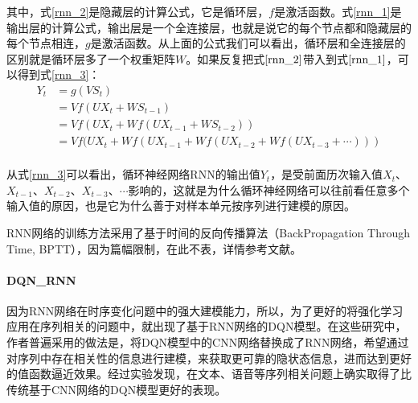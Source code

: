 其中，式\eqref{rnn_2}是隐藏层的计算公式，它是循环层，$f$是激活函数。式\eqref{rnn_1}是输出层的计算公式，输出层是一个全连接层，也就是说它的每个节点都和隐藏层的每个节点相连，$g$是激活函数。从上面的公式我们可以看出，循环层和全连接层的区别就是循环层多了一个权重矩阵$W$。如果反复把式$\eqref{rnn_2}$带入到式$\eqref{rnn_1}$，可以得到式\eqref{rnn_3}：
\begin{equation}
\label{rnn_3}
\begin{aligned}
Y_{t}&=g(V S_{t})\\
&=V f(U X_{t}+W S_{t-1})\\
&=V f(U X_{t}+W f(U X_{t-1}+W S_{t-2}))\\
&=V f(U X_{t}+W f(U X_{t-1}+W f(U X_{t-2}+W f(U X_{t-3}+\cdots)))\\
\end{aligned}
\end{equation}

从式\eqref{rnn_3}可以看出，循环神经网络RNN的输出值$Y_{t}$，是受前面历次输入值$X_{t}$、$X_{t-1}$、$X_{t-2}$、$X_{t-3}$、$\cdots$影响的，这就是为什么循环神经网络可以往前看任意多个输入值的原因，也是它为什么善于对样本单元按序列进行建模的原因。

RNN网络的训练方法采用了基于时间的反向传播算法（BackPropagation Through Time, BPTT），因为篇幅限制，在此不表，详情参考文献\citep{bersini1997simplification}。

 \paragraph{DQN_RNN}
 因为RNN网络在时序变化问题中的强大建模能力，所以，为了更好的将强化学习应用在序列相关的问题中，就出现了基于RNN网络的DQN模型\citep{hausknecht2015deep,narasimhan2015language}。在这些研究中，作者普遍采用的做法是，将DQN模型中的CNN网络替换成了RNN网络，希望通过对序列中存在相关性的信息进行建模，来获取更可靠的隐状态信息，进而达到更好的值函数逼近效果。经过实验发现，在文本、语音等序列相关问题上确实取得了比传统基于CNN网络的DQN模型更好的表现\citep{bakker2002reinforcement,hausknecht2015deep,lin1993reinforcement,narasimhan2015language}。

